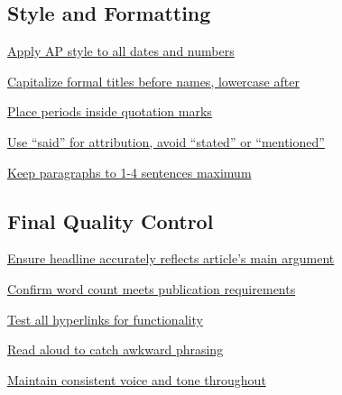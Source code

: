 \documentclass[12pt]{article}
\begin{document}
\subsection{Style and Formatting}

\begin{Form}
\noindent\CheckBox[name=ap-dates,width=1em,height=1em]{} \hyperref[sec:ap-dates]{\textcolor{atlantic}{Apply AP style to all dates and numbers}}

\vspace{0.3em}
\noindent\CheckBox[name=title-capitalization,width=1em,height=1em]{} \hyperref[sec:title-capitalization]{\textcolor{atlantic}{Capitalize formal titles before names, lowercase after}}

\vspace{0.3em}
\noindent\CheckBox[name=quote-punctuation,width=1em,height=1em]{} \hyperref[sec:quote-punctuation]{\textcolor{atlantic}{Place periods inside quotation marks}}

\vspace{0.3em}
\noindent\CheckBox[name=attribution-verbs,width=1em,height=1em]{} \hyperref[sec:attribution-verbs]{\textcolor{atlantic}{Use ``said'' for attribution, avoid ``stated'' or ``mentioned''}}

\vspace{0.3em}
\noindent\CheckBox[name=paragraph-length,width=1em,height=1em]{} \hyperref[sec:paragraph-length]{\textcolor{atlantic}{Keep paragraphs to 1-4 sentences maximum}}
\end{Form}

\subsection{Final Quality Control}

\begin{Form}
\noindent\CheckBox[name=headline-accuracy,width=1em,height=1em]{} \hyperref[sec:headline-accuracy]{\textcolor{atlantic}{Ensure headline accurately reflects article's main argument}}

\vspace{0.3em}
\noindent\CheckBox[name=word-count,width=1em,height=1em]{} \hyperref[sec:word-count]{\textcolor{atlantic}{Confirm word count meets publication requirements}}

\vspace{0.3em}
\noindent\CheckBox[name=hyperlink-check,width=1em,height=1em]{} \hyperref[sec:hyperlink-check]{\textcolor{atlantic}{Test all hyperlinks for functionality}}

\vspace{0.3em}
\noindent\CheckBox[name=readability,width=1em,height=1em]{} \hyperref[sec:readability]{\textcolor{atlantic}{Read aloud to catch awkward phrasing}}

\vspace{0.3em}
\noindent\CheckBox[name=consistency,width=1em,height=1em]{} \hyperref[sec:consistency]{\textcolor{atlantic}{Maintain consistent voice and tone throughout}}
\end{Form}
\end{document}
